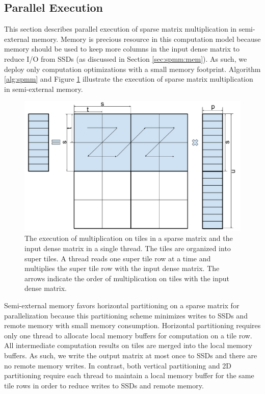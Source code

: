 \subsection{Parallel Execution} \label{sec:exec}
This section describes parallel execution of sparse matrix multiplication
in semi-external memory. Memory is precious resource in this computation model
because memory should be used to keep more columns in the input dense matrix
to reduce I/O from SSDs (as discussed in Section \ref{sec:spmm:mem}).
As such, we deploy only computation optimizations with a small memory footprint.
Algorithm \ref{alg:spmm} and Figure \ref{spmm_exec} illustrate the execution of
sparse matrix multiplication in semi-external memory.

\begin{figure}
\centering
\includegraphics[scale=0.3]{SpMM_figs/SpMM_exec.pdf}
\caption{The execution of multiplication on tiles in a sparse matrix and
	the input dense matrix in a single thread. The tiles are organized into super
	tiles. A thread reads one super tile row at a time and multiplies
	the super tile row with the input dense matrix. The arrows indicate
the order of multiplication on tiles with the input dense matrix.}
\label{spmm_exec}
\end{figure}

Semi-external memory favors horizontal partitioning on a sparse matrix
for parallelization because this partitioning scheme minimizes writes to SSDs
and remote memory with small memory consumption. Horizontal partitioning
requires only one thread to allocate local memory buffers for computation on
a tile row. All intermediate computation results on tiles are merged into
the local memory buffers. As such, we write the output matrix at most once
to SSDs and there are no remote memory writes.
In contrast, both vertical partitioning and 2D partitioning require each
thread to maintain a local memory buffer for the same tile rows in order
to reduce writes to SSDs and remote memory.

